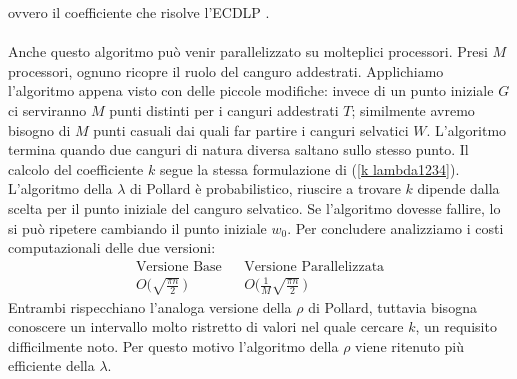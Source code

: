 \documentclass[a4paper,12pt]{tesiinfo}
\newcommand\ddfrac[2]{\frac{\displaystyle #1}{\displaystyle #2}}
\begin{document}
ovvero il coefficiente che risolve l'ECDLP \cite{parall rho}.
\\
\\
Anche questo algoritmo pu\`o venir parallelizzato su molteplici processori. Presi $M$ processori, ognuno ricopre il ruolo del canguro addestrati. Applichiamo l'algoritmo appena visto con delle piccole modifiche: invece di un punto iniziale $G$ ci serviranno $M$ punti distinti per i canguri addestrati $T$; similmente avremo bisogno di $M$ punti casuali dai quali far partire i canguri selvatici $W$. L'algoritmo termina quando due canguri di natura diversa saltano sullo stesso punto. Il calcolo del coefficiente $k$ segue la stessa formulazione di (\ref{k lambda1234}).
\\
L'algoritmo della $\lambda$ di Pollard \`e probabilistico, riuscire a trovare $k$ dipende dalla scelta per il punto iniziale del canguro selvatico. Se l'algoritmo dovesse fallire, lo si pu\`o ripetere cambiando il punto iniziale $w_0$. Per concludere analizziamo i costi computazionali delle due versioni: 
\begin{align*}
\text{Versione Base}& &\text{Versione Parallelizzata} \\
 O\Big(\sqrt{\ddfrac{\pi n}{2}}\, \Big)& &O\Big(\ddfrac{1}{M}{\sqrt{\ddfrac{\pi n}{2}}} \, \Big)
\end{align*}
Entrambi rispecchiano l'analoga versione della $\rho$ di Pollard, tuttavia bisogna conoscere un intervallo molto ristretto di valori nel quale cercare $k$, un requisito difficilmente noto. Per questo motivo l'algoritmo della $\rho$ viene ritenuto pi\`u efficiente della $\lambda$.
%
%
%
%
%
%
%
%
%
%
%
%
%
%
%
%
\end{document}
